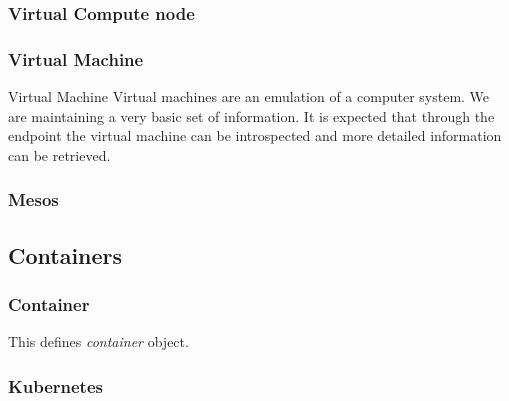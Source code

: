 \documentclass[10pt]{article}
\begin{document}
\subsubsection{Virtual Compute node}


\subsubsection{Virtual Machine}

Virtual Machine 
Virtual machines are an emulation of a computer system. We are maintaining a very basic set of information. It is expected that through the endpoint the virtual machine can be introspected and more detailed information can be retrieved. 


\subsubsection{Mesos}



\subsection{Containers}

\subsubsection{Container}

This defines {\em container} object.


\subsubsection{Kubernetes}



\end{document}
